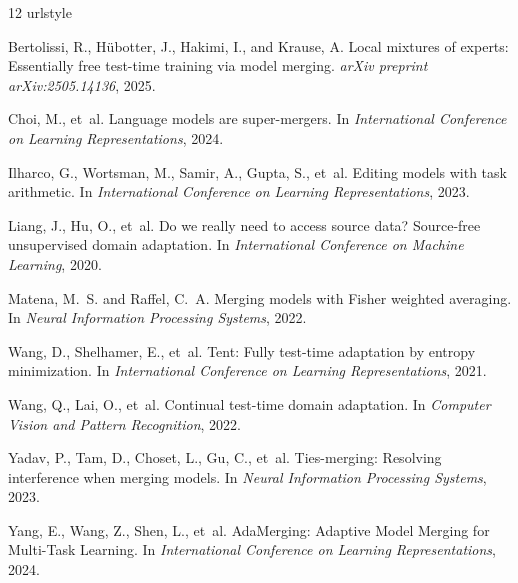 \documentclass{article}
\theoremstyle{plain}
\theoremstyle{definition}
\theoremstyle{remark}
\begin{document}
\begin{thebibliography}{12}
\providecommand{\natexlab}[1]{#1}
\providecommand{\url}[1]{\texttt{#1}}
\expandafter\ifx\csname urlstyle\endcsname\relax
  \providecommand{\doi}[1]{doi: #1}\else
  \providecommand{\doi}{doi: \begingroup \Url}\fi

Bertolissi, R., H{\"u}botter, J., Hakimi, I., and Krause, A.
\newblock Local mixtures of experts: Essentially free test-time training via model merging.
\newblock \emph{arXiv preprint arXiv:2505.14136}, 2025.

Choi, M., et~al.
\newblock Language models are super-mergers.
\newblock In \emph{International Conference on Learning Representations}, 2024.

Ilharco, G., Wortsman, M., Samir, A., Gupta, S., et~al.
\newblock Editing models with task arithmetic.
\newblock In \emph{International Conference on Learning Representations}, 2023.

Liang, J., Hu, O., et~al.
\newblock Do we really need to access source data? Source-free unsupervised domain adaptation.
\newblock In \emph{International Conference on Machine Learning}, 2020.

Matena, M.~S. and Raffel, C.~A.
\newblock Merging models with Fisher weighted averaging.
\newblock In \emph{Neural Information Processing Systems}, 2022.

Wang, D., Shelhamer, E., et~al.
\newblock Tent: Fully test-time adaptation by entropy minimization.
\newblock In \emph{International Conference on Learning Representations}, 2021.

Wang, Q., Lai, O., et~al.
\newblock Continual test-time domain adaptation.
\newblock In \emph{Computer Vision and Pattern Recognition}, 2022.

Yadav, P., Tam, D., Choset, L., Gu, C., et~al.
\newblock Ties-merging: Resolving interference when merging models.
\newblock In \emph{Neural Information Processing Systems}, 2023.

Yang, E., Wang, Z., Shen, L., et~al.
\newblock AdaMerging: Adaptive Model Merging for Multi-Task Learning.
\newblock In \emph{International Conference on Learning Representations}, 2024.


\end{thebibliography}
\end{document}
